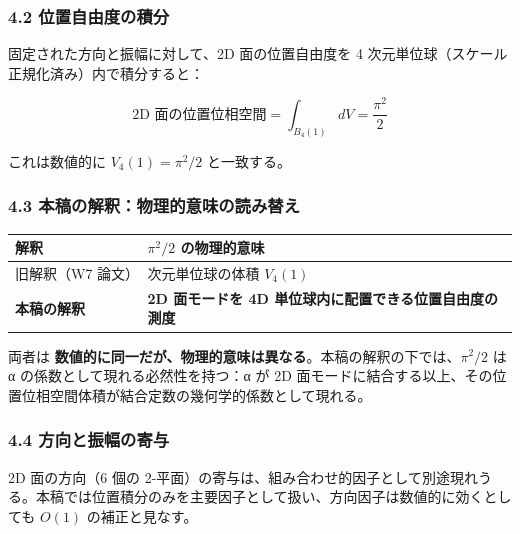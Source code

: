 \documentclass[
  11pt]{ltjsarticle}
\newcounter{none} %
\begin{document}
\subsubsection{4.2
位置自由度の積分}\label{ux4f4dux7f6eux81eaux7531ux5ea6ux306eux7a4dux5206}

固定された方向と振幅に対して、2D 面の位置自由度を 4
次元単位球（スケール正規化済み）内で積分すると：

\[\text{2D 面の位置位相空間} = \int_{B_4(1)} dV = \frac{\pi^2}{2}\]

これは数値的に \textbf{\(V_4(1) = \pi^2/2\)} と一致する。

\subsubsection{4.3
本稿の解釈：物理的意味の読み替え}\label{ux672cux7a3fux306eux89e3ux91c8ux7269ux7406ux7684ux610fux5473ux306eux8aadux307fux66ffux3048}

{\def\LTcaptype{none} %
\begin{longtable}[]{@{}
  >{\raggedright\arraybackslash}p{}
  >{\raggedright\arraybackslash}p{}@{}}
\toprule\noalign{}
\begin{minipage}[b]{\linewidth}\raggedright
解釈
\end{minipage} & \begin{minipage}[b]{\linewidth}\raggedright
\(\pi^2/2\) の物理的意味
\end{minipage} \\
\midrule\noalign{}
\endhead
\bottomrule\noalign{}
\endlastfoot
旧解釈（W7 論文） & 4 次元単位球の体積 \(V_4(1)\) \\
\textbf{本稿の解釈} & \textbf{2D 面モードを 4D
単位球内に配置できる位置自由度の測度} \\
\end{longtable}
}

両者は
\textbf{数値的に同一だが、物理的意味は異なる}。本稿の解釈の下では、\(\pi^2/2\)
は α の係数として現れる必然性を持つ：α が 2D
面モードに結合する以上、その位置位相空間体積が結合定数の幾何学的係数として現れる。

\subsubsection{4.4
方向と振幅の寄与}\label{ux65b9ux5411ux3068ux632fux5e45ux306eux5bc4ux4e0e}

2D 面の方向（6 個の
2-平面）の寄与は、組み合わせ的因子として別途現れうる。本稿では位置積分のみを主要因子として扱い、方向因子は数値的に効くとしても
\(O(1)\) の補正と見なす。
\end{document}
